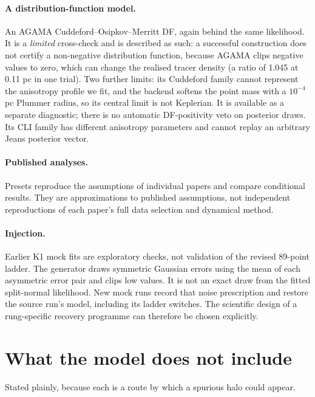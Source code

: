 \documentclass[11pt,a4paper]{article}
\begin{document}
\paragraph{A distribution-function model.} An AGAMA Cuddeford--Osipkov--Merritt DF, again
behind the same likelihood. It is a \emph{limited} cross-check and is described as such: a
successful construction does not certify a non-negative distribution function, because AGAMA
clips negative values to zero, which can change the realised tracer density (a ratio of
1.045 at 0.11 pc in one trial). Two further limits: its Cuddeford family cannot represent
the anisotropy profile we fit, and the backend softens the point mass with a $10^{-4}$\,pc
Plummer radius, so its central limit is not Keplerian. It is available as a separate diagnostic; there is no automatic DF-positivity veto on
posterior draws. Its CLI family has different anisotropy parameters and cannot replay an
arbitrary Jeans posterior vector.

\paragraph{Published analyses.} Presets reproduce the assumptions of individual papers and
compare conditional results. They are approximations to published assumptions, not
independent reproductions of each paper's full data selection and dynamical method.

\paragraph{Injection.} Earlier K1 mock fits are exploratory checks, not validation of the revised 89-point
ladder. The generator draws symmetric Gaussian errors using the mean of each asymmetric
error pair and clips low values. It is not an exact draw from the fitted split-normal
likelihood. New mock runs record that noise prescription and restore the source run's
model, including its ladder switches. The scientific design of a rung-specific recovery
programme can therefore be chosen explicitly.

\section{What the model does not include}

Stated plainly, because each is a route by which a spurious halo could appear.
\end{document}
